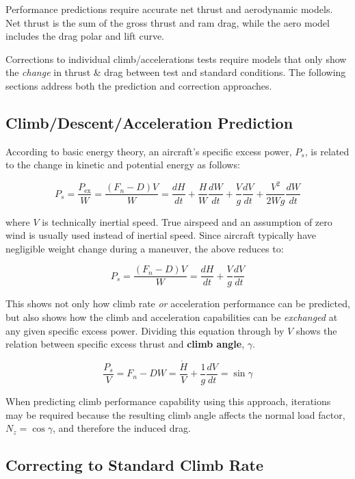 \documentclass[
]{book}
\begin{document}
Performance predictions require accurate net thrust and aerodynamic models. Net
thrust is the sum of the gross thrust and ram drag, while the aero model
includes the drag polar and lift curve.

Corrections to individual climb/accelerations tests require models that only
show the \emph{change} in thrust \& drag between test and standard conditions. The
following sections address both the prediction and correction approaches.

\hypertarget{climbdescentacceleration-prediction}{%
\subsection{Climb/Descent/Acceleration Prediction}\label{climbdescentacceleration-prediction}}

According to basic energy theory, an aircraft's specific excess power, \(P_s\),
is related to the change in kinetic and potential energy as follows:

\[
P_s = \frac{P_{\text{ex}}}{W} = \frac{\left( F_n - D \right) V}{W} = \frac{dH}{dt} + \frac{H}{W} \frac{d W}{dt} + \frac{V}{g}\frac{dV}{dt} + \frac{V^2}{2Wg} \frac{dW}{dt}
\label{eq:p-sub-s}
\]

where \(V\) is technically inertial speed. True airspeed and an assumption of
zero wind is usually used instead of inertial speed. Since aircraft typically
have negligible weight change during a maneuver, the above reduces to:

\[
P_s = \frac{\left( F_n - D \right) V}{W} = \frac{dH}{dt} + \frac{V}{g}\frac{dV}{dt}
\label{eq:p-sub-s-redux}
\]

This shows not only how climb rate \emph{or} acceleration performance can be
predicted, but also shows how the climb and acceleration capabilities can be
\emph{exchanged} at any given specific excess power. Dividing this equation through
by \(V\) shows the relation between specific excess thrust and \textbf{climb angle},
\textbf{\(\gamma\)}.

\[
\frac{P_s}{V} = {F_n - D}{W} = \frac{\dot{H}}{V} + \frac{1}{g} \frac{dV}{dt} = \sin \gamma
\label{eq:p-sub-s-over-v}
\]

When predicting climb performance capability using this approach, iterations may
be required because the resulting climb angle affects the normal load factor,
\(N_z = \cos \gamma\), and therefore the induced drag.

\hypertarget{correcting-to-standard-climb-rate}{%
\subsection{Correcting to Standard Climb Rate}\label{correcting-to-standard-climb-rate}}
\end{document}

